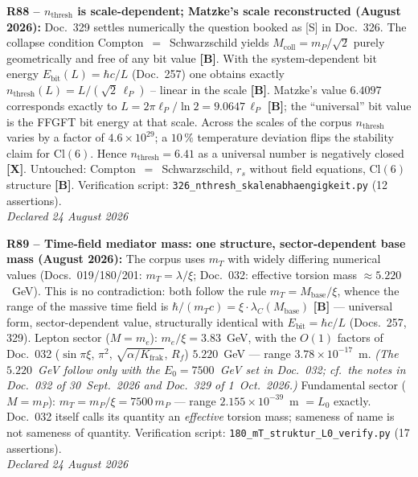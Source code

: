 \medskip

\textbf{R88 -- $n_{\mathrm{thresh}}$ is scale-dependent; Matzke's scale reconstructed (August 2026):}
Doc.~329 settles numerically the question booked as [S] in Doc.~326.
The collapse condition Compton~$=$~Schwarzschild yields $M_{\mathrm{coll}} = m_P/\sqrt{2}$ purely geometrically and free of any bit value \textbf{[B]}.
With the system-dependent bit energy $E_{\mathrm{bit}}(L) = \hbar c/L$ (Doc.~257) one obtains exactly $n_{\mathrm{thresh}}(L) = L/(\sqrt{2}\,\ell_P)$ -- linear in the scale \textbf{[B]}.
Matzke's value $6.4097$ corresponds exactly to $L = 2\pi\ell_P/\ln 2 = 9.0647\,\ell_P$ \textbf{[B]}; the ``universal'' bit value is the FFGFT bit energy at that scale.
Across the scales of the corpus $n_{\mathrm{thresh}}$ varies by a factor of $4.6\times10^{29}$; a $10\,\%$ temperature deviation flips the stability claim for $\mathrm{Cl}(6)$.
Hence $n_{\mathrm{thresh}} = 6.41$ as a universal number is negatively closed \textbf{[X]}.
Untouched: Compton~$=$~Schwarzschild, $r_s$ without field equations, $\mathrm{Cl}(6)$ structure \textbf{[B]}.
Verification script: \texttt{326\_nthresh\_skalenabhaengigkeit.py} (12 assertions).\\
\emph{Declared 24 August 2026}

\medskip

\textbf{R89 -- Time-field mediator mass: one structure, sector-dependent base mass (August 2026):}
The corpus uses $m_T$ with widely differing numerical values (Docs.~019/180/201: $m_T = \lambda/\xi$; Doc.~032: effective torsion mass $\approx 5.220$~GeV). This is no contradiction: both follow the rule $m_T = M_\mathrm{base}/\xi$, whence the range of the massive time field is $\hbar/(m_T c) = \xi\cdot\lambda_C(M_\mathrm{base})$ \textbf{[B]} --- universal form, sector-dependent value, structurally identical with $E_\mathrm{bit} = \hbar c/L$ (Docs.~257, 329).
Lepton sector ($M = m_e$): $m_e/\xi = 3.83$~GeV, with the $O(1)$ factors of Doc.~032 ($\sin\pi\xi$, $\pi^2$, $\sqrt{\alpha/K_\mathrm{frak}}$, $R_f$) $5.220$~GeV --- range $3.78\times10^{-17}$~m. \emph{(The $5.220$~GeV follow only with the $E_0=7500$~GeV set in Doc.~032; cf.\ the notes in Doc.~032 of 30~Sept.~2026 and Doc.~329 of 1~Oct.~2026.)}
Fundamental sector ($M = m_P$): $m_T = m_P/\xi = 7500\,m_P$ --- range $2.155\times10^{-39}$~m $= L_0$ exactly.
Doc.~032 itself calls its quantity an \emph{effective} torsion mass; sameness of name is not sameness of quantity.
Verification script: \texttt{180\_mT\_struktur\_L0\_verify.py} (17 assertions).\\
\emph{Declared 24 August 2026}

